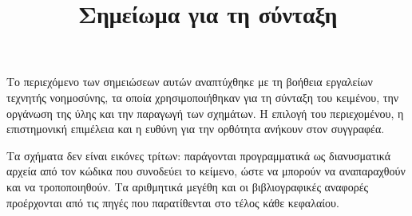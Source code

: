 \title{Σημείωμα για τη σύνταξη}

Το περιεχόμενο των σημειώσεων αυτών αναπτύχθηκε με τη βοήθεια εργαλείων τεχνητής
νοημοσύνης, τα οποία χρησιμοποιήθηκαν για τη σύνταξη του κειμένου, την οργάνωση της ύλης
και την παραγωγή των σχημάτων. Η επιλογή του περιεχομένου, η επιστημονική επιμέλεια και η
ευθύνη για την ορθότητα ανήκουν στον συγγραφέα.

Τα σχήματα δεν είναι εικόνες τρίτων: παράγονται προγραμματικά ως διανυσματικά αρχεία από
τον κώδικα που συνοδεύει το κείμενο, ώστε να μπορούν να αναπαραχθούν και να τροποποιηθούν.
Τα αριθμητικά μεγέθη και οι βιβλιογραφικές αναφορές προέρχονται από τις πηγές που
παρατίθενται στο τέλος κάθε κεφαλαίου.
